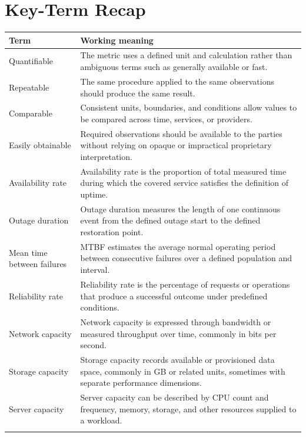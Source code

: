 \documentclass[11pt]{article}
\begin{document}
\section{Key-Term Recap}
\begin{longtable}{@{}>{\RaggedRight\arraybackslash}p{}>{\RaggedRight\arraybackslash}p{}@{}}
\toprule\rowcolor{Navy}\color{white}\textbf{Term} & \color{white}\textbf{Working meaning}\\\midrule\endhead
Quantifiable & The metric uses a defined unit and calculation rather than ambiguous terms such as generally available or fast. \\\addlinespace[2pt]
Repeatable & The same procedure applied to the same observations should produce the same result. \\\addlinespace[2pt]
Comparable & Consistent units, boundaries, and conditions allow values to be compared across time, services, or providers. \\\addlinespace[2pt]
Easily obtainable & Required observations should be available to the parties without relying on opaque or impractical proprietary interpretation. \\\addlinespace[2pt]
Availability rate & Availability rate is the proportion of total measured time during which the covered service satisfies the definition of uptime. \\\addlinespace[2pt]
Outage duration & Outage duration measures the length of one continuous event from the defined outage start to the defined restoration point. \\\addlinespace[2pt]
Mean time between failures & MTBF estimates the average normal operating period between consecutive failures over a defined population and interval. \\\addlinespace[2pt]
Reliability rate & Reliability rate is the percentage of requests or operations that produce a successful outcome under predefined conditions. \\\addlinespace[2pt]
Network capacity & Network capacity is expressed through bandwidth or measured throughput over time, commonly in bits per second. \\\addlinespace[2pt]
Storage capacity & Storage capacity records available or provisioned data space, commonly in GB or related units, sometimes with separate performance dimensions. \\\addlinespace[2pt]
Server capacity & Server capacity can be described by CPU count and frequency, memory, storage, and other resources supplied to a workload. \\\addlinespace[2pt]

\end{longtable}
\end{document}
